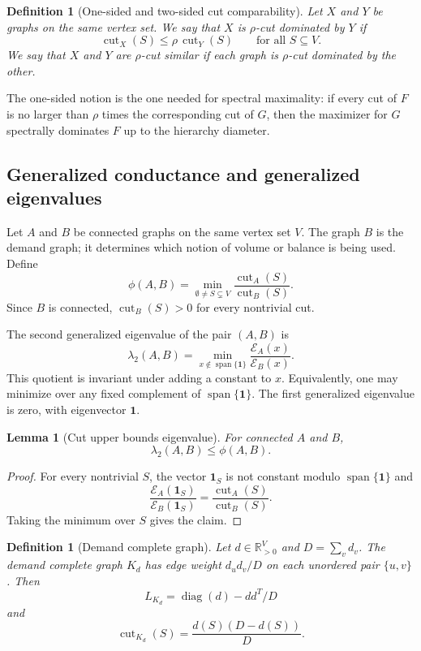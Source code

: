 \documentclass[11pt]{article}
\newtheorem{lemma}[theorem]{Lemma}
\newtheorem{definition}[theorem]{Definition}
\newcommand{\R}{\mathbb{R}}
\newcommand{\one}{\mathbf{1}}
\newcommand{\cut}{\operatorname{cut}}
\newcommand{\diag}{\operatorname{diag}}
\newcommand{\E}{\mathcal{E}}
\begin{document}
\begin{definition}[One-sided and two-sided cut comparability]
Let $X$ and $Y$ be graphs on the same vertex set.  We say that $X$ is
$\rho$-cut dominated by $Y$ if
\[
  \cut_X(S)\le \rho\,\cut_Y(S)\qquad\text{for all }S\subseteq V.
\]
We say that $X$ and $Y$ are $\rho$-cut similar if each graph is
$\rho$-cut dominated by the other.
\end{definition}

The one-sided notion is the one needed for spectral maximality: if every cut
of $F$ is no larger than $\rho$ times the corresponding cut of $G$, then the
maximizer for $G$ spectrally dominates $F$ up to the hierarchy diameter.

\subsection{Generalized conductance and generalized eigenvalues}

Let $A$ and $B$ be connected graphs on the same vertex set $V$.  The graph
$B$ is the demand graph; it determines which notion of volume or balance is
being used.  Define
\[
  \phi(A,B)=\min_{\emptyset\ne S\subsetneq V}
    \frac{\cut_A(S)}{\cut_B(S)} .
\]
Since $B$ is connected, $\cut_B(S)>0$ for every nontrivial cut.

The second generalized eigenvalue of the pair $(A,B)$ is
\[
  \lambda_2(A,B)=
  \min_{x\notin \operatorname{span}\{\one\}}
  \frac{\E_A(x)}{\E_B(x)} .
\]
This quotient is invariant under adding a constant to $x$.  Equivalently,
one may minimize over any fixed complement of $\operatorname{span}\{\one\}$.
The first generalized eigenvalue is zero, with eigenvector $\one$.

\begin{lemma}[Cut upper bounds eigenvalue]
\label{lem:lambda-le-phi}
For connected $A$ and $B$,
\[
  \lambda_2(A,B)\le \phi(A,B).
\]
\end{lemma}

\begin{proof}
For every nontrivial $S$, the vector $\mathbf{1}_S$ is not constant modulo
$\operatorname{span}\{\one\}$ and
\[
  \frac{\E_A(\mathbf{1}_S)}{\E_B(\mathbf{1}_S)}
  =\frac{\cut_A(S)}{\cut_B(S)} .
\]
Taking the minimum over $S$ gives the claim.
\end{proof}

\begin{definition}[Demand complete graph]
Let $d\in\R_{>0}^V$ and $D=\sum_v d_v$.  The demand complete graph $K_d$ has
edge weight $d_ud_v/D$ on each unordered pair $\{u,v\}$.  Then
\[
  L_{K_d}=\diag(d)-dd^T/D
\]
and
\[
  \cut_{K_d}(S)=\frac{d(S)(D-d(S))}{D}.
\]
\end{definition}
\end{document}
